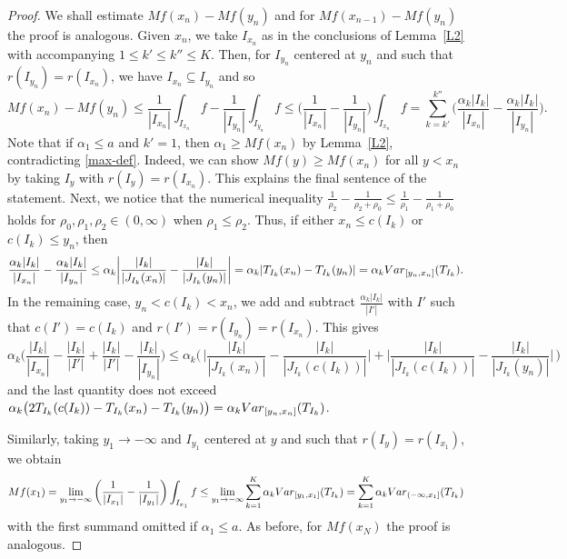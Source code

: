\documentclass[leqno,11pt]{amsart}
\numberwithin{equation}{section}
\numberwithin{theorem}{section}
\newcommand{\Var}{{\rm Var}}
\begin{document}
	\begin{proof}
		We shall estimate $Mf(x_n) - Mf(y_n)$ and for $Mf(x_{n-1}) - Mf(y_{n})$ the proof is analogous.
		Given $x_n$, we take $I_{x_n}$ as in the conclusions of Lemma~\ref{L2} with accompanying $1\le k'\le k''\le K$.
		Then, for $I_{y_n}$  centered at $y_n$ and such that $r(I_{y_n}) = r(I_{x_n})$, we have $I_{x_n} \subseteq I_{y_n}$ and so
		\[
		Mf(x_n) - Mf(y_n) \leq 
		\frac{1}{|I_{x_n}|}\int_{I_{x_n}} f - \frac{1}{|I_{y_n}|}\int_{I_{y_n}} f 
		\leq \bigg( \frac{1}{|I_{x_n}|} - \frac{1}{|I_{y_n}|} \bigg) \int_{I_{x_n}} f
		= \sum_{k=k'}^{k''} 
		\bigg( \frac{\alpha_k |I_k|}{|I_{x_n}|} -  \frac{\alpha_k |I_k|}{|I_{y_n}|} \bigg).
		\] 
		Note that if $\alpha_1 \leq a$ and $k'=1$, then $\alpha_1 \geq Mf(x_n)$ by Lemma~\ref{L2}, contradicting \eqref{max-def}. Indeed, we can show $Mf(y) \geq Mf(x_n)$ for all 
		$y < x_n$ by taking $I_y$ with $r(I_y) = r(I_{x_n})$. This explains the final sentence of the statement. Next, we notice that the numerical inequality $ \frac{1}{\rho_2} - \frac{1}{\rho_2 + \rho_0}\le \frac{1}{\rho_1} - \frac{1}{\rho_1 + \rho_0}$ holds for $\rho_0, \rho_1, \rho_2 \in (0,\infty)$ when $\rho_1 \leq \rho_2$. Thus, if either $x_n \leq c(I_k)$ or $c(I_k) \leq y_n$, then 
		\[
		\frac{\alpha_k |I_k|}{|I_{x_n}|} -  \frac{\alpha_k |I_k|}{|I_{y_n}|}
		\leq 
		\alpha_k \bigg| \frac{|I_k|}{|J_{I_k}(x_n)|} -  \frac{|I_k|}{|J_{I_k}(y_n)|} \bigg|
		= \alpha_k |T_{I_k}(x_n) - T_{I_k}(y_n)| = \alpha_k \Var_{[y_n, x_n]} (T_{I_k}).
		\]
		In the remaining case, $y_n < c(I_k) < x_n$, we add and subtract $\frac{\alpha_k |I_k|}{|I'|}$ with $I'$ such that $c(I') = c(I_k)$ and $r(I') = r(I_{y_n}) = r(I_{x_n})$. This gives 
		\[
		\alpha_k \bigg( \frac{|I_k|}{|I_{x_n}|} - \frac{|I_k|}{|I'|} + \frac{|I_k|}{|I'|} -  \frac{|I_k|}{|I_{y_n}|} \bigg)
		\leq 
		\alpha_k \bigg( \, \bigg| \frac{|I_k|}{|J_{I_k}(x_n)|} -  \frac{|I_k|}{|J_{I_k}(c(I_k))|} \bigg|
		+ \bigg| \frac{|I_k|}{|J_{I_k}(c(I_k))|} -  \frac{ |I_k|}{|J_{I_k}(y_n)|} \bigg| \, \bigg) 
		\]
		and the last quantity does not exceed 
		$\alpha_k \big(2T_{I_k}(c(I_k)) - T_{I_k}(x_n) - T_{I_k}(y_n)\big) = \alpha_k \Var_{[y_n, x_n]} (T_{I_k})$.
		
		Similarly, taking $y_1 \to -\infty$ and $I_{y_1}$ centered at $y$ and such that $r(I_{y}) = r(I_{x_1})$, we obtain
		\[
		Mf(x_1)
		= \lim_{y_1 \to -\infty} \bigg( \frac{1}{|I_{x_1}|} - \frac{1}{|I_{y_1}|} \bigg) \int_{I_{x_1}} f 
		\leq \lim_{y_1 \to -\infty} \sum_{k=1}^K \alpha_k \Var_{[y_1, x_1]} (T_{I_k})
		= \sum_{k=1}^K \alpha_k \Var_{(-\infty, x_1]} (T_{I_k})
		\]
		with the first summand omitted if $\alpha_1 \leq a$. As before, for $Mf(x_{N})$ the proof is analogous. 
	\end{proof} 
	    
\end{document}
